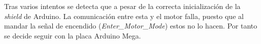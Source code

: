 Tras varios intentos se detecta que a pesar de la correcta inicialización de la \textit{shield} de Arduino. La comunicación entre esta y el motor falla, puesto que al mandar la señal de encendido (\textit{Enter\_Motor\_Mode}) estos no lo hacen. Por tanto se decide seguir con la placa Arduino Mega.


